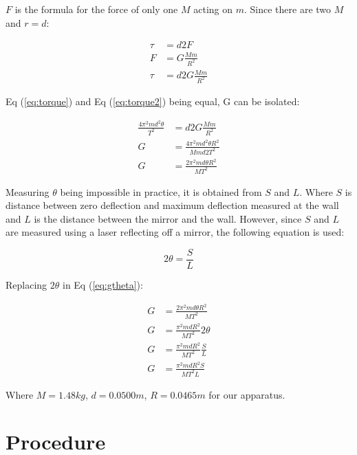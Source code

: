 \documentclass[12pt]{article}
\begin{document}
    $F$ is the formula for the force of only one $M$ acting on $m$. Since there are two $M$ and $r = d$:

    \begin{align}
        \tau&=d2F\nonumber\\ 
        F&=G\frac{Mm}{R^2}\nonumber\\
        \tau&=d2G\frac{Mm}{R^2} \label {eq:torque2}
    \end{align}

    Eq (\ref{eq:torque}) and Eq (\ref{eq:torque2}) being equal, G can be isolated:


    \begin{equation}
        \begin{aligned}
            \frac{4\pi^2md^2\theta}{T^2}&=d2G\frac{Mm}{R^2}\\
            G&=\frac{4\pi^2md^2\theta R^2}{Mmd2T^2}\\
            G&=\frac{2\pi^2md\theta R^2}{MT^2}\label{eq:gtheta}
        \end{aligned}
    \end{equation}

    Measuring $\theta$ being impossible in practice, it is obtained from $S$ and $L$. Where $S$ is distance between zero deflection and maximum deflection measured at the wall and $L$ is the distance between the mirror and the wall. However, since $S$ and $L$ are measured using a laser reflecting off a mirror, the following equation is used:

    \begin{equation}
        2\theta = \frac{S}{L}
    \end{equation}

    Replacing $2\theta$ in Eq (\ref{eq:gtheta}):

    \begin{equation}
        \begin{aligned}
            G&=\frac{2\pi^2md\theta R^2}{MT^2}\\
            G&=\frac{\pi^2mdR^2}{MT^2} 2\theta\\
            G&=\frac{\pi^2mdR^2}{MT^2}  \frac{S}{L}\\
            G&=\frac{\pi^2mdR^2S}{MT^2L} \label{eq:final}
        \end{aligned}
    \end{equation}

    Where $M = 1.48kg$, $d = 0.0500m$, $R = 0.0465m$ for our apparatus.
\newpage
\section*{Procedure}
\end{document}
